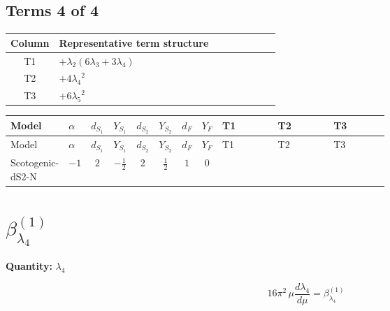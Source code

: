 \documentclass[8pt]{article}
\begin{document}
\begin{landscape}
\subsection*{Terms 4 of 4}
\begin{center}
\begin{tabular}{@{}c >{\raggedright\arraybackslash}p{0.82\linewidth}@{}}
\toprule
Column & Representative term structure \\
\midrule
T1 & \(\displaystyle +{\lambda_2} (6 {\lambda_3}+3 {\lambda_4})\) \\
\midrule
T2 & \(\displaystyle +4 {\lambda_4}^2\) \\
\midrule
T3 & \(\displaystyle +6 {\lambda_5}^2\) \\
\midrule
\bottomrule
\end{tabular}
\end{center}
\smallskip
\tiny
\begin{longtable}{@{}llcccccc >{\raggedright\arraybackslash}p{0.21\linewidth} >{\raggedright\arraybackslash}p{0.21\linewidth} >{\raggedright\arraybackslash}p{0.21\linewidth}@{}}
\toprule
Model & $\alpha$ & $d_{S_1}$ & $Y_{S_1}$ & $d_{S_2}$ & $Y_{S_2}$ & $d_F$ & $Y_F$ & T1 & T2 & T3 \\
\midrule
\endfirsthead
\toprule
Model & $\alpha$ & $d_{S_1}$ & $Y_{S_1}$ & $d_{S_2}$ & $Y_{S_2}$ & $d_F$ & $Y_F$ & T1 & T2 & T3 \\
\midrule
\endhead
Scotogenic-dS2-N & $-1$ & $2$ & $-\frac{1}{2}$ & $2$ & $\frac{1}{2}$ & $1$ & $0$ & \scriptsize\adjustbox{max width=\linewidth}{$\begin{gathered} +{\lambda_2} (6 {\lambda_3}+3 {\lambda_4})\end{gathered}$} & \scriptsize\adjustbox{max width=\linewidth}{$\begin{gathered} +4 {\lambda_4}^2\end{gathered}$} & \scriptsize\adjustbox{max width=\linewidth}{$\begin{gathered} +6 {\lambda_5}^2\end{gathered}$} \\
\midrule
\bottomrule
\end{longtable}
\clearpage
\section*{$\beta_{\lambda_4}^{(1)}$}
\noindent\textbf{Quantity: }$\lambda_4$\par\smallskip
\[16\pi^2\,\mu\frac{d \lambda_4}{d\mu}=\beta_{\lambda_4}^{(1)}\]

\end{landscape}
\end{document}
